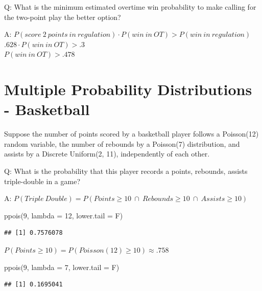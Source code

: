 \documentclass[
  11pt,
]{book}
\newenvironment{Shaded}{\begin{snugshade}}{\end{snugshade}}
\newcommand{\AttributeTok}[1]{\textcolor[rgb]{0.77,0.63,0.00}{#1}}
\newcommand{\DecValTok}[1]{\textcolor[rgb]{0.00,0.00,0.81}{#1}}
\newcommand{\FunctionTok}[1]{\textcolor[rgb]{0.00,0.00,0.00}{#1}}
\newcommand{\NormalTok}[1]{#1}
\theoremstyle{definition}
\theoremstyle{definition}
\theoremstyle{definition}
\theoremstyle{definition}
\theoremstyle{remark}
\begin{document}
Q: What is the minimum estimated overtime win probability to make calling for the two-point play the better option?

A: \(P(score\ 2\ points\ in\ regulation) \cdot P(win\ in\ OT) > P(win\ in\ regulation)\)\\
\(.628 \cdot P(win\ in\ OT) > .3\)\\
\(P(win\ in\ OT) > .478\)

\hypertarget{multiple-probability-distributions---basketball}{%
\section{Multiple Probability Distributions - Basketball}\label{multiple-probability-distributions---basketball}}

Suppose the number of points scored by a basketball player follows a Poisson(12) random variable, the number of rebounds by a Poisson(7) distribution, and assists by a Discrete Uniform(2, 11), independently of each other.

Q: What is the probability that this player records a points, rebounds, assists triple-double in a game?

A: \(P(Triple\ Double) = P(Points \geq 10\ \cap\ Rebounds \geq 10\ \cap\ Assists \geq 10)\)

\begin{Shaded}
\begin{Highlighting}[]
\FunctionTok{ppois}\NormalTok{(}\DecValTok{9}\NormalTok{, }\AttributeTok{lambda =} \DecValTok{12}\NormalTok{, }\AttributeTok{lower.tail =}\NormalTok{ F)}
\end{Highlighting}
\end{Shaded}

\begin{verbatim}
## [1] 0.7576078
\end{verbatim}

\(P(Points \geq 10) = P(Poisson(12) \geq 10) \approx .758\)

\begin{Shaded}
\begin{Highlighting}[]
\FunctionTok{ppois}\NormalTok{(}\DecValTok{9}\NormalTok{, }\AttributeTok{lambda =} \DecValTok{7}\NormalTok{, }\AttributeTok{lower.tail =}\NormalTok{ F)}
\end{Highlighting}
\end{Shaded}

\begin{verbatim}
## [1] 0.1695041
\end{verbatim}
\end{document}
